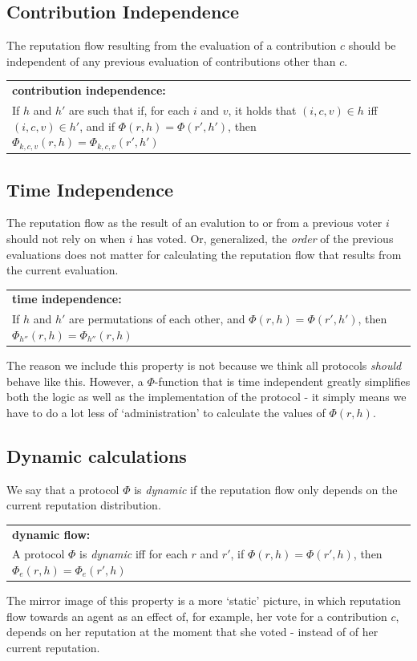 \documentclass{article}
\newcommand{\flow}{\Phi}
\newenvironment{condition}[1]
	{
	\begin{center}
	   \begin{tabular}{|p{.9\textwidth}|}
		\hline \medskip
		{\bf #1:}\\
	}
	{
		\medskip \\\hline
	\end{tabular}
	\end{center}
	}
\begin{document}
\subsection{Contribution Independence}

The reputation flow resulting from the evaluation of a contribution $c$ should be independent of any previous evaluation of contributions other than $c$.
\begin{condition}{contribution independence}
If $h$ and $h'$ are such that 
if, for each $i$ and $v$, it holds that $(i, c, v)  \in h$ iff  $(i, c, v) \in h'$, and if $\flow(r, h) = \flow(r', h')$, then
$\flow_{k,c,v}(r, h) = \flow_{k,c,v}(r', h')$
\end{condition}


\subsection{Time Independence}

The reputation flow as the result of an evalution to or from a previous voter $i$ should not rely on when $i$ has voted. Or, generalized, the {\em order} of the previous evaluations does not matter for calculating the reputation flow that results from the current evaluation. 
\begin{condition}{time independence}
If $h$ and $h'$ are permutations of each other, and $\flow(r, h) = \flow(r', h')$, then $\flow_{h''}(r, h) = \flow_{h''}(r, h)$
\label{condition: time independence}
\end{condition}
The reason we include this property is not because we think all protocols {\em should} behave like this. However, a $\flow$-function that is time independent greatly simplifies both the logic as well as the implementation of the protocol - it simply means we have to do a lot less of `administration' to calculate the values of $\Phi(r, h)$.

\subsection{Dynamic calculations}

We say that a protocol $\flow$ is {\em dynamic} if the reputation flow only depends on the current reputation distribution.
\begin{condition}{dynamic flow}
A protocol $\flow$ is {\em dynamic} iff for each $r$ and $r'$, if $\Phi(r, h) = \Phi(r', h)$, then $\Phi_{e}(r, h) = \Phi_{e}(r', h)$
\end{condition}
The mirror image of this property is a more `static' picture, in which reputation flow towards an agent as an effect of, for example, her vote for a contribution $c$, depends on her reputation at the moment that she voted - instead of of her current reputation. 
\end{document}
